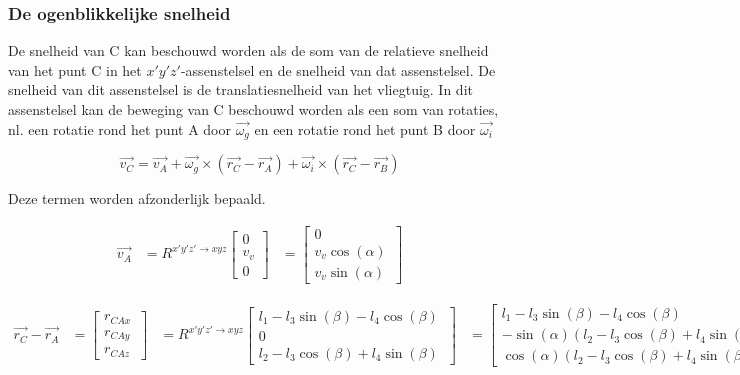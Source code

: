 \subsubsection{De ogenblikkelijke snelheid} \label{snelh_c}
De snelheid van C kan beschouwd worden als de som van de relatieve snelheid van het punt C in het $x'y'z'$-assenstelsel en de snelheid van dat assenstelsel. De snelheid van dit assenstelsel is de translatiesnelheid van het vliegtuig. In dit assenstelsel kan de beweging van C beschouwd worden als een som van rotaties, nl. een rotatie rond het punt A door $\overrightarrow{\omega_{g}}$ en een rotatie rond het punt B door $\overrightarrow{\omega_{i}}$

\begin{equation}
\overrightarrow{v_{C}}=\overrightarrow{v_{A}}+\overrightarrow{\omega_{g}}\times(\overrightarrow{r_{C}}-\overrightarrow{r_{A}})+\overrightarrow{\omega_{i}}\times(\overrightarrow{r_{C}}-\overrightarrow{r_{B}})
\end{equation}

Deze termen worden afzonderlijk bepaald.

\begin{equation*}
\begin{split}
\overrightarrow{v_{A}}
&=R^{x'y'z' \rightarrow xyz}
	\begin{bmatrix}
	0\\
	v_v\\
	0
	\end{bmatrix}
&=	\begin{bmatrix}
	0\\
	v_v\cos(\alpha)\\
	v_v\sin(\alpha)\
	\end{bmatrix}
\end{split}
\end{equation*}

\begin{equation*}
\begin{split}
\overrightarrow{r_{C}}-\overrightarrow{r_{A}}
&=	\begin{bmatrix}
	r_{CAx}\\
	r_{CAy}\\
	r_{CAz}\
	\end{bmatrix}
&=R^{x'y'z' \rightarrow xyz}
	\begin{bmatrix}
	l_{1}-l_{3}\sin(\beta)-l_{4}\cos(\beta)\\
	0\\
	l_{2}-l_{3}\cos(\beta)+l_{4}\sin(\beta)\
	\end{bmatrix}
&=	\begin{bmatrix}
	l_{1}-l_{3}\sin(\beta)-l_{4}\cos(\beta)\\
	-\sin(\alpha)(l_{2}-l_{3}\cos(\beta)+l_{4}\sin(\beta))\\
	\cos(\alpha)(l_{2}-l_{3}\cos(\beta)+l_{4}\sin(\beta))\
	\end{bmatrix}
\end{split}
\end{equation*}

